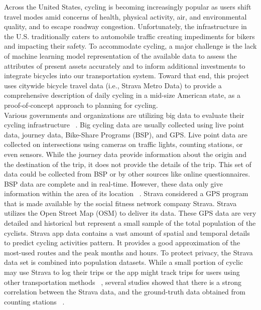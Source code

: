 \documentclass{report}
\begin{document}
Across the United States, cycling is becoming increasingly popular as users shift travel modes amid concerns of health, physical activity, air, and environmental quality, and to escape roadway congestion. Unfortunately, the infrastructure in the U.S. traditionally caters to automobile traffic creating impediments for bikers and impacting their safety. To accommodate cycling, a major challenge is the lack of machine learning model representation of the available data to assess the attributes of present assets accurately and to inform additional investments to integrate bicycles into our transportation system. Toward that end, this project uses citywide bicycle travel data (i.e., Strava Metro Data) to provide a comprehensive description of daily cycling in a mid-size American state, as a proof-of-concept approach to planning for cycling. 
\\Various governments and organizations are utilizing big data to evaluate their cycling infrastructure ~\cite{hall2012open}. Big cycling data are usually collected using live point data, journey data, Bike-Share Programs (BSP), and GPS. Live point data are collected on intersections using cameras on traffic lights, counting stations, or even sensors. While the journey data provide information about the origin and the destination of the trip, it does not provide the details of the trip. This set of data could be collected from BSP or by other sources like online questionnaires. BSP data are complete and in real-time. However, these data only give information within the area of its location ~\cite{ romanillos2016big, rogers2000counting}. Strava considered a GPS program that is made available by the social fitness network company Strava. Strava utilizes the Open Street Map (OSM) to deliver its data. These GPS data are very detailed and historical but represent a small sample of the total population of the cyclists.  
Strava app data contains a vast amount of spatial and temporal details to predict cycling activities pattern. It provides a good approximation of the most-used routes and the peak months and hours. To protect privacy, the Strava data set is combined into population datasets. While a small portion of cyclic may use Strava to log their trips or the app might track trips for users using other transportation methods ~\cite{hall2012open, romanillos2016big, fishman2016cycling }, several studies showed that there is a strong correlation between the Strava data, and the ground-truth data obtained from counting stations ~\cite{hong2020evaluation, jestico2016mapping}. 
\end{document}
